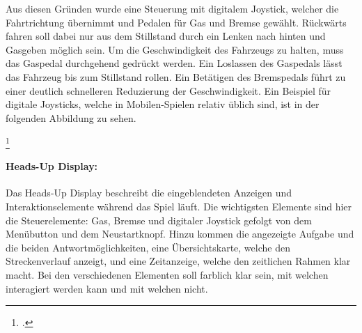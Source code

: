 		Aus diesen Gründen wurde eine Steuerung mit digitalem Joystick, welcher die Fahrtrichtung übernimmt und Pedalen für Gas und Bremse gewählt. Rückwärts fahren soll dabei nur aus dem Stillstand durch ein Lenken nach hinten und Gasgeben möglich sein.
		Um die Geschwindigkeit des Fahrzeugs zu halten, muss das Gaspedal durchgehend gedrückt werden.
		Ein Loslassen des Gaspedals lässt das Fahrzeug bis zum Stillstand rollen. Ein Betätigen des Bremspedals führt zu einer deutlich schnelleren Reduzierung der Geschwindigkeit.
		Ein Beispiel für digitale Joysticks, welche in Mobilen-Spielen relativ üblich sind, ist in der folgenden Abbildung zu sehen.

		\footcitetext[\url{http://www2.ea.com/uk/fifa-11-iphone/images/f784dabc26b7b210VgnVCM2000001165140aRCRD}]{easports}

		\paragraph{Heads-Up Display:}
			Das Heads-Up Display beschreibt die eingeblendeten Anzeigen und Interaktionselemente während das Spiel läuft.
			Die wichtigsten Elemente sind hier die Steuerelemente: Gas, Bremse und digitaler Joystick gefolgt von dem Menübutton und dem Neustartknopf.%
			Hinzu kommen die angezeigte Aufgabe und die beiden Antwortmöglichkeiten, eine Übersichtskarte, welche den Streckenverlauf anzeigt, und eine Zeitanzeige, welche den zeitlichen Rahmen klar macht.
			Bei den verschiedenen Elementen soll farblich klar sein, mit welchen interagiert werden kann und mit welchen nicht.


